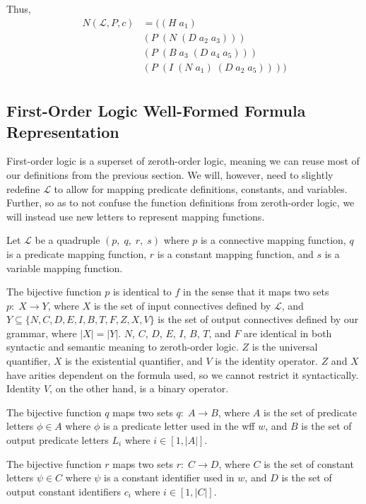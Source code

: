 \documentclass[ms]{uncgdissertationexp2}
\theoremstyle{plain}
\theoremstyle{definition}
\theoremstyle{remark}
\begin{document}
\noindent Thus, 
\begin{align*}
    N(\mathcal{L}, P, c) &= ((H\;a_1)\;\\
    &(P\;(N\;(D\;a_2\;a_3)))\\
    &(P\;(B\;a_3\;(D\;a_4\;a_5)))\\
    &(P\;(I\;(N\;a_1)\;(D\;a_2\;a_5))))\\
\end{align*}

\subsection{First-Order Logic Well-Formed Formula Representation}

First-order logic is a superset of zeroth-order logic, meaning we can reuse most of our definitions from the previous section. We will, however, need to slightly redefine $\mathcal{L}$ to allow for mapping predicate definitions, constants, and variables. Further, so as to not confuse the function definitions from zeroth-order logic, we will instead use new letters to represent mapping functions.

Let $\mathcal{L}$ be a quadruple $(p,\;q,\;r,\;s)$ where $p$ is a connective mapping function, $q$ is a predicate mapping function, $r$ is a constant mapping function, and $s$ is a variable mapping function. 

The bijective function $p$ is identical to $f$ in the sense that it maps two sets $p:\;X \to Y$, where $X$ is the set of input connectives defined by $\mathcal{L}$, and $Y \subseteq \{N, C, D, E, I, B, T, F, Z, X, V\}$ is the set of output connectives defined by our grammar, where $|X| = |Y|$. $N$, $C$, $D$, $E$, $I$, $B$, $T$, and $F$ are identical in both syntactic and semantic meaning to zeroth-order logic. $Z$ is the universal quantifier, $X$ is the existential quantifier, and $V$ is the identity operator. $Z$ and $X$ have arities dependent on the formula used, so we cannot restrict it syntactically. Identity $V$, on the other hand, is a binary operator.

The bijective function $q$ maps two sets $q:\;A \to B$, where $A$ is the set of predicate letters $\phi \in A$ where $\phi$ is a predicate letter used in the wff $w$, and $B$ is the set of output predicate letters $L_{i}$ where $i \in [1, |A|]$.

The bijective function $r$ maps two sets $r:\;C \to D$, where $C$ is the set of constant letters $\psi \in C$ where $\psi$ is a constant identifier used in $w$, and $D$ is the set of output constant identifiers $c_{i}$ where $i \in [1, |C|]$.
\end{document}
